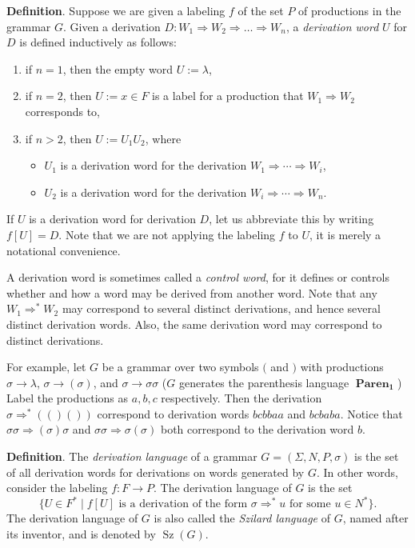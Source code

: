 \documentclass[12pt]{article}
\begin{document}
\textbf{Definition}.  Suppose we are given a labeling $f$ of the set $P$ of productions in the grammar $G$.  Given a derivation $D:W_1 \Rightarrow W_2 \Rightarrow \ldots \Rightarrow W_n$, a \emph{derivation word} $U$ for $D$ is defined inductively as follows:
\begin{enumerate}
\item if $n=1$, then the empty word $U:=\lambda$,
\item if $n=2$, then $U:=x\in F$ is a label for a production that $W_1 \Rightarrow W_2$ corresponds to,
\item if $n>2$, then $U:=U_1U_2$, where 
\begin{itemize}
\item $U_1$ is a derivation word for the derivation $W_1 \Rightarrow \cdots \Rightarrow W_i$, 
\item $U_2$ is a derivation word for the derivation $W_i \Rightarrow \cdots \Rightarrow W_n$.
\end{itemize}
\end{enumerate}
If $U$ is a derivation word for derivation $D$, let us abbreviate this by writing $f[U]=D$.  Note that we are not applying the labeling $f$ to $U$, it is merely a notational convenience.

A derivation word is sometimes called a \emph{control word}, for it defines or controls whether and how a word may be derived from another word.  Note that any $W_1\Rightarrow^* W_2$ may correspond to several distinct derivations, and hence several distinct derivation words.  Also, the same derivation word may correspond to distinct derivations.

For example, let $G$ be a grammar over two symbols $($ and $)$ with productions $\sigma \to \lambda$, $\sigma \to (\sigma)$, and $\sigma \to \sigma \sigma$ ($G$ generates the parenthesis language $\boldsymbol{\operatorname{Paren}_1}$) Label the productions as $a,b,c$ respectively.  Then the derivation $\sigma \Rightarrow^* (()())$ correspond to derivation words $bcbbaa$ and $bcbaba$.  Notice that $\sigma \sigma \Rightarrow (\sigma) \sigma$ and $\sigma\sigma \Rightarrow \sigma (\sigma)$ both correspond to the derivation word $b$.

\textbf{Definition}.  The \emph{derivation language} of a grammar $G=(\Sigma,N,P,\sigma)$ is the set of all derivation words for derivations on words generated by $G$.  In other words, consider the labeling $f:F\to P$.  The derivation language of $G$ is the set
$$\lbrace U\in F^* \mid f[U] \mbox{ is a derivation of the form }\sigma \Rightarrow^* u \mbox{ for some }u \in N^*\rbrace.$$
The derivation language of $G$ is also called the \emph{Szilard language} of $G$, named after its inventor, and is denoted by $\operatorname{Sz}(G)$.
\end{document}
